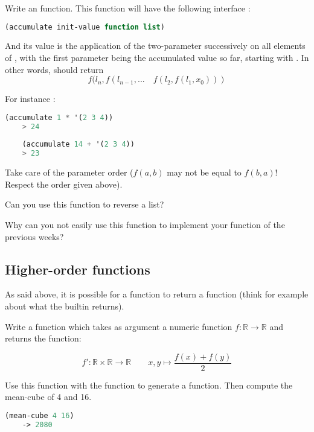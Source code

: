 \documentclass{../../../tp}
\begin{document}
\begin{instruction}
	Write an  function. This function will have the following interface :
	\begin{lstlisting}[language=lisp]
	(accumulate init-value function list)
	\end{lstlisting}
	
	And its value is the application of the two-parameter  successively on all elements of , with the first parameter being the accumulated value so far, starting with . In other words,  should return
	$$ f(l_n, f(l_{n-1}, ... \quad f(l_2, f(l_1, x_0))) $$
	
	For instance :
	\begin{lstlisting}[language=lisp]
	(accumulate 1 * '(2 3 4))
	> 24
	
	(accumulate 14 + '(2 3 4))
	> 23
	\end{lstlisting}
	
	Take care of the parameter order ($f(a,b)$ may not be equal to $f(b,a)$! Respect the order given above).
	
	Can you use this function to reverse a list? 
	
	Why can you not easily use this function to implement your  function of the previous weeks? 
\end{instruction}

	
\subsection{Higher-order functions}

As said above, it is possible for a function to return a function (think for example about what the  builtin returns). 

\begin{instruction}
	Write a function  which takes as argument a numeric function $f: \mathbb{R} \rightarrow \mathbb{R}$ and returns the function: 
	
	$$ f': \mathbb{R} \times \mathbb{R} \rightarrow \mathbb{R} \qquad  x,y  \mapsto  \frac{f(x) + f(y)}{2}$$
	
	
	Use this function with the  function to generate a  function. Then compute the mean-cube of 4 and 16.
	
	\begin{lstlisting}[language=lisp]
	(mean-cube 4 16)
	-> 2080
	\end{lstlisting}
	
\end{instruction}
\end{document}
